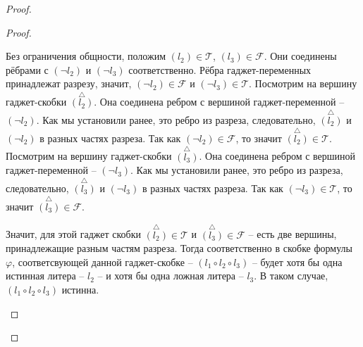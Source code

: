 \documentclass[a4paper,12pt]{article}
\begin{document}
\begin{proof}
\begin{proof}
\begin{itemize}
\begin{center}
            \end{center}
            Без ограничения общности, положим $(l_2) \in \mathcal{T}$, $(l_3) \in \mathcal{F}$. Они соединены рёбрами с $(\neg l_2)$ и $(\neg l_3)$ соответственно. Рёбра гаджет-переменных принадлежат разрезу, значит, $(\neg l_2) \in \mathcal{F}$ и $(\neg l_3) \in \mathcal{T}$. Посмотрим на вершину гаджет-скобки $\overset{\bigtriangleup}{(l_2)}$. Она соединена ребром с вершиной гаджет-переменной -- $(\neg l_2)$. Как мы установили ранее, это ребро из разреза, следовательно, $\overset{\bigtriangleup}{(l_2)}$ и $(\neg l_2)$ в разных частях разреза. Так как  $(\neg l_2) \in \mathcal{F}$, то значит $\overset{\bigtriangleup}{(l_2)}\in \mathcal{T}$. Посмотрим на вершину гаджет-скобки $\overset{\bigtriangleup}{(l_3)}$. Она соединена ребром с вершиной гаджет-переменной -- $(\neg l_3)$. Как мы установили ранее, это ребро из разреза, следовательно, $\overset{\bigtriangleup}{(l_3)}$ и $(\neg l_3)$ в разных частях разреза. Так как  $(\neg l_3) \in \mathcal{T}$, то значит $\overset{\bigtriangleup}{(l_3)}\in \mathcal{F}$. 
            
            Значит, для этой гаджет скобки $\overset{\bigtriangleup}{(l_2)}\in \mathcal{T}$ и $\overset{\bigtriangleup}{(l_3)}\in \mathcal{F}$ -- есть две вершины, принадлежащие разным частям разреза. Тогда соответственно в скобке формулы $\varphi$, соответсвующей данной гаджет-скобке -- $(l_1 \circ l_2 \circ l_3)$ -- будет хотя бы одна истинная литера -- $l_2$ -- и хотя бы одна ложная литера -- $l_3$. В таком случае, $(l_1 \circ l_2 \circ l_3)$ истинна.
            

\end{itemize}
\end{proof}
\end{proof}
\end{document}
